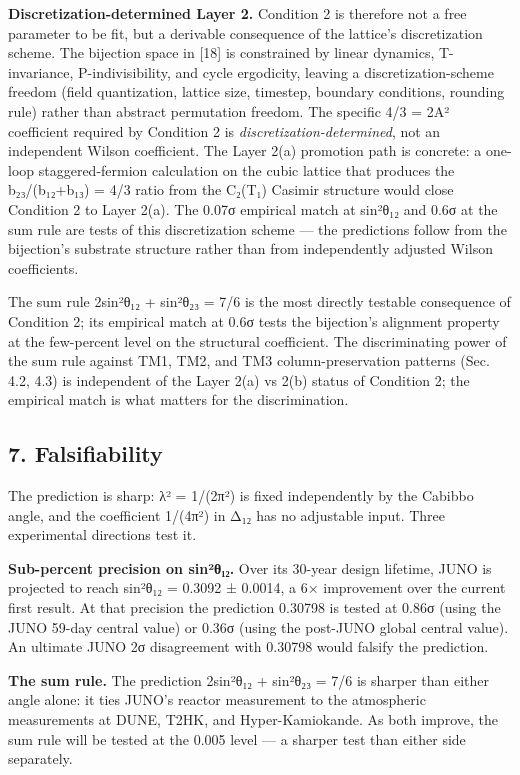 \documentclass[
  11pt,
  letterpaper,
]{article}
\begin{document}
\textbf{Discretization-determined Layer 2.} Condition 2 is therefore not
a free parameter to be fit, but a derivable consequence of the lattice's
discretization scheme. The bijection space in {[}18{]} is constrained by
linear dynamics, T-invariance, P-indivisibility, and cycle ergodicity,
leaving a discretization-scheme freedom (field quantization, lattice
size, timestep, boundary conditions, rounding rule) rather than abstract
permutation freedom. The specific 4/3 = 2A² coefficient required by
Condition 2 is \emph{discretization-determined}, not an independent
Wilson coefficient. The Layer 2(a) promotion path is concrete: a
one-loop staggered-fermion calculation on the cubic lattice that
produces the b₂₃/(b₁₂+b₁₃) = 4/3 ratio from the C₂(T₁) Casimir structure
would close Condition 2 to Layer 2(a). The 0.07σ empirical match at
sin²θ₁₂ and 0.6σ at the sum rule are tests of this discretization scheme
--- the predictions follow from the bijection's substrate structure
rather than from independently adjusted Wilson coefficients.

The sum rule 2sin²θ₁₂ + sin²θ₂₃ = 7/6 is the most directly testable
consequence of Condition 2; its empirical match at 0.6σ tests the
bijection's alignment property at the few-percent level on the
structural coefficient. The discriminating power of the sum rule against
TM1, TM2, and TM3 column-preservation patterns (Sec. 4.2, 4.3) is
independent of the Layer 2(a) vs 2(b) status of Condition 2; the
empirical match is what matters for the discrimination.

\hypertarget{falsifiability}{%
\subsection{7. Falsifiability}\label{falsifiability}}

The prediction is sharp: λ² = 1/(2π²) is fixed independently by the
Cabibbo angle, and the coefficient 1/(4π²) in Δ₁₂ has no adjustable
input. Three experimental directions test it.

\textbf{Sub-percent precision on sin²θ₁₂.} Over its 30-year design
lifetime, JUNO is projected to reach sin²θ₁₂ = 0.3092 ± 0.0014, a 6×
improvement over the current first result. At that precision the
prediction 0.30798 is tested at 0.86σ (using the JUNO 59-day central
value) or 0.36σ (using the post-JUNO global central value). An ultimate
JUNO 2σ disagreement with 0.30798 would falsify the prediction.

\textbf{The sum rule.} The prediction 2sin²θ₁₂ + sin²θ₂₃ = 7/6 is
sharper than either angle alone: it ties JUNO's reactor measurement to
the atmospheric measurements at DUNE, T2HK, and Hyper-Kamiokande. As
both improve, the sum rule will be tested at the 0.005 level --- a
sharper test than either side separately.
\end{document}
